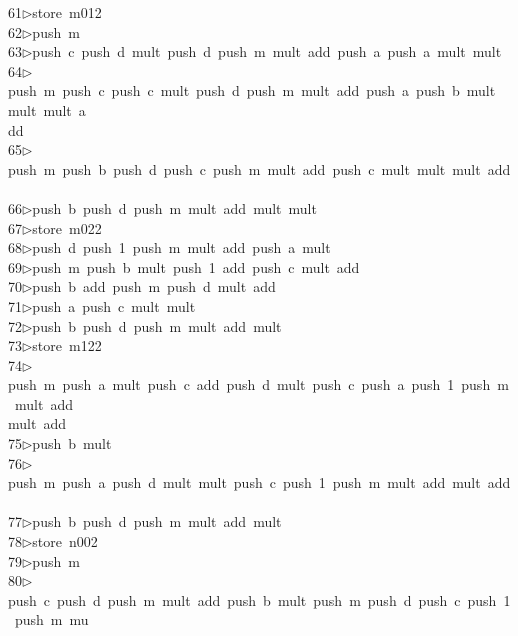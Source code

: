 \begin{tabbing}
61\>$\triangleright$\>store\ m012\ \\[0pt]
62\>$\triangleright$\>push\ m\\[0pt]
63\>$\triangleright$\>push\ c\ push\ d\ mult\ push\ d\ push\ m\ mult\ add\ push\ a\ push\ a\ mult\ mult\ \\[0pt]
64\>$\triangleright$\>push\ m\ push\ c\ push\ c\ mult\ push\ d\ push\ m\ mult\ add\ push\ a\ push\ b\ mult\ mult\ mult\ a\\[0pt]
\>dd\ \\[0pt]
65\>$\triangleright$\>push\ m\ push\ b\ push\ d\ push\ c\ push\ m\ mult\ add\ push\ c\ mult\ mult\ mult\ add\ \\[0pt]
66\>$\triangleright$\>push\ b\ push\ d\ push\ m\ mult\ add\ mult\ mult\ \\[0pt]
67\>$\triangleright$\>store\ m022\ \\[0pt]
68\>$\triangleright$\>push\ d\ push\ 1\ push\ m\ mult\ add\ push\ a\ mult\ \\[0pt]
69\>$\triangleright$\>push\ m\ push\ b\ mult\ push\ 1\ add\ push\ c\ mult\ add\ \\[0pt]
70\>$\triangleright$\>push\ b\ add\ push\ m\ push\ d\ mult\ add\ \\[0pt]
71\>$\triangleright$\>push\ a\ push\ c\ mult\ mult\ \\[0pt]
72\>$\triangleright$\>push\ b\ push\ d\ push\ m\ mult\ add\ mult\ \\[0pt]
73\>$\triangleright$\>store\ m122\ \\[0pt]
74\>$\triangleright$\>push\ m\ push\ a\ mult\ push\ c\ add\ push\ d\ mult\ push\ c\ push\ a\ push\ 1\ push\ m\ mult\ add\ \\[0pt]
\>mult\ add\ \\[0pt]
75\>$\triangleright$\>push\ b\ mult\ \\[0pt]
76\>$\triangleright$\>push\ m\ push\ a\ push\ d\ mult\ mult\ push\ c\ push\ 1\ push\ m\ mult\ add\ mult\ add\ \\[0pt]
77\>$\triangleright$\>push\ b\ push\ d\ push\ m\ mult\ add\ mult\ \\[0pt]
78\>$\triangleright$\>store\ n002\ \\[0pt]
79\>$\triangleright$\>push\ m\ \\[0pt]
80\>$\triangleright$\>push\ c\ push\ d\ push\ m\ mult\ add\ push\ b\ mult\ push\ m\ push\ d\ push\ c\ push\ 1\ push\ m\ mu\\[0pt]

\end{tabbing}

